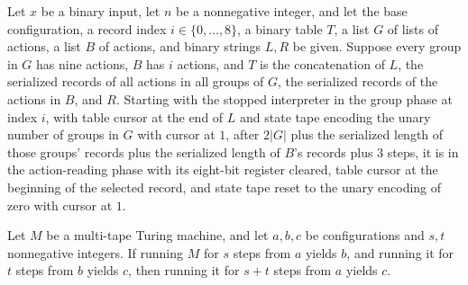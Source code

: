 \begin{lemma}
\label{Turing.timedCut_select}
\leanok
{}
Let $x$ be a binary input, let $n$ be a nonnegative integer, and let the base
configuration, a record index $i\in\{0,\ldots,8\}$, a binary table $T$, a list $G$ of
lists of actions, a list $B$ of actions, and binary strings $L,R$ be given. Suppose
every group in $G$ has nine actions, $B$ has $i$ actions, and $T$ is the concatenation
of $L$, the serialized records of all actions in all groups of $G$, the serialized
records of the actions in $B$, and $R$. Starting with the stopped interpreter in the
group phase at index $i$, with table cursor at the end of $L$ and state tape encoding
the unary number of groups in $G$ with cursor at $1$, after $2|G|$ plus the serialized
length of those groups’ records plus the serialized length of $B$’s records plus $3$
steps, it is in the action-reading phase with its eight-bit register cleared, table
cursor at the beginning of the selected record, and state tape reset to the unary
encoding of zero with cursor at $1$.
\end{lemma}

\begin{lemma}
\label{Turing.timedCut_run_join}
\leanok
{}
Let $M$ be a multi-tape Turing machine, and let $a,b,c$ be configurations and $s,t$
nonnegative integers. If running $M$ for $s$ steps from $a$ yields $b$, and running it
for $t$ steps from $b$ yields $c$, then running it for $s+t$ steps from $a$ yields $c$.
\end{lemma}

